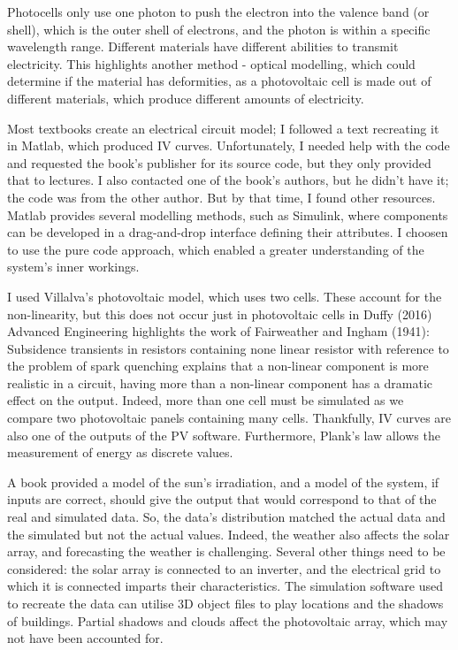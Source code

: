 \documentclass{article}
\begin{document}
Photocells only use one photon to push the electron into the valence band (or shell), which is the outer shell of electrons, and the photon is within a specific wavelength range. Different materials have different abilities to transmit electricity. This highlights another method - optical modelling, which could determine if the material has deformities, as a photovoltaic cell is made out of different materials, which produce different amounts of electricity. 

Most textbooks create an electrical circuit model; I followed a text recreating it in Matlab, which produced IV curves. Unfortunately, I needed help with the code and requested the book's publisher for its source code, but they only provided that to lectures. I also contacted one of the book's authors, but he didn't have it; the code was from the other author. But by that time, I found other resources. Matlab provides several modelling methods, such as Simulink, where components can be developed in a drag-and-drop interface defining their attributes. I choosen to use the pure code approach, which enabled a greater understanding of the system's inner workings. 

I used Villalva's photovoltaic model, which uses two cells. These account for the non-linearity, but this does not occur just in photovoltaic cells in Duffy (2016) Advanced Engineering highlights the work of Fairweather and Ingham (1941): Subsidence transients in resistors containing none linear resistor with reference to the problem of spark quenching explains that a non-linear component is more realistic in a circuit, having more than a non-linear component has a dramatic effect on the output. Indeed, more than one cell must be simulated as we compare two photovoltaic panels containing many cells. Thankfully, IV curves are also one of the outputs of the PV software. Furthermore, Plank's law allows the measurement of energy as discrete values. 

A book provided a model of the sun's irradiation, and a model of the system, if inputs are correct, should give the output that would correspond to that of the real and simulated data. So, the data's distribution matched the actual data and the simulated but not the actual values. Indeed, the weather also affects the solar array, and forecasting the weather is challenging. Several other things need to be considered: the solar array is connected to an inverter, and the electrical grid to which it is connected imparts their characteristics. The simulation software used to recreate the data can utilise 3D object files to play locations and the shadows of buildings. Partial shadows and clouds affect the photovoltaic array, which may not have been accounted for. 
\end{document}
